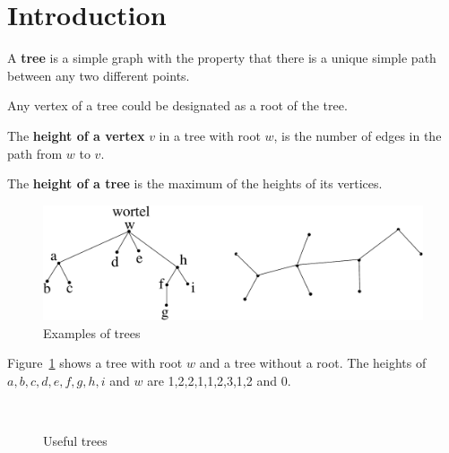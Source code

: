 \section{Introduction}

 \begin{definition}[Tree]
  \textup{ A \textbf{tree} is a simple graph with the property that
there is a unique simple path between any two different points. }
\end{definition}

Any vertex of a tree could be designated as a root of the tree.

 \begin{definition}
  \textup{
The
 \textbf{height of a vertex} $v$ in a tree with root
    $w$, is the number of edges in the path from $w$ to $v$. }
\end{definition}

 \begin{definition}
  \textup{
The
\textbf{height of a tree} is the maximum of the heights of its vertices.}
\end{definition}

\begin{figure}[ht]
\begin{center}
\includegraphics[width=0.5\linewidth,keepaspectratio]{bomen1}
\end{center}
\caption{Examples of trees \label{bomen1}}
\end{figure}


Figure~\ref{bomen1} shows a tree with root $w$ and a tree without a
root. The heights of $a,b,c,d,e,f,g,h,i$ and $w$ are 1,2,2,1,1,2,3,1,2
and 0.

\begin{figure}[ht]
\centering
\mbox{
{}}
\caption{Useful trees}
\end{figure}


